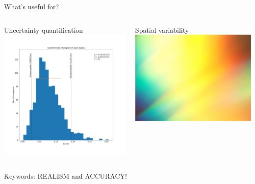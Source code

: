 \documentclass[dvipsnames]{beamer}
\begin{document}
	\begin{frame}{What's useful for?}
	\begin{columns}
	\begin{column}{0.5\textwidth}
	\begin{block}{Uncertainty quantification}
	\includegraphics[width=\textwidth]{images/rf_hist.jpg}
	\end{block}
	\end{column}
	\begin{column}{0.5\textwidth}
	\begin{block}{Spatial variability}
	\vspace{0.5cm}
	\includegraphics[width=\textwidth]{images/gradient.jpg}
	\end{block}
	
	\end{column}
	\end{columns}
	\alert{Keywords: REALISM and ACCURACY!}
	\end{frame}
	
\end{document}
